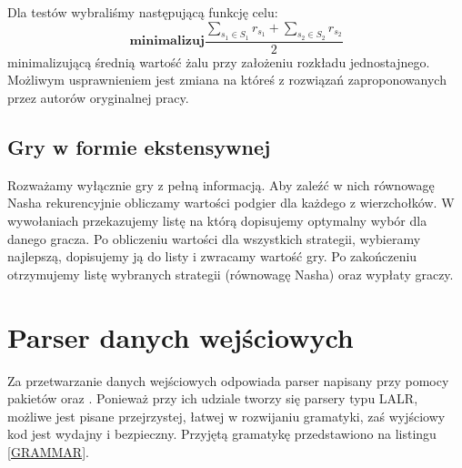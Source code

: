 \documentclass[polish]{standalone}
\begin{document}
Dla testów wybraliśmy następującą funkcję celu:
$$\textbf{minimalizuj} \frac{\sum_{s_1 \in S_1} r_{s_1} + \sum_{s_2 \in S_2} r_{s_2}}{2}$$
minimalizującą średnią wartość żalu przy założeniu rozkładu jednostajnego. Możliwym usprawnieniem jest zmiana na któreś
z rozwiązań zaproponowanych przez autorów oryginalnej pracy.

\subsection{Gry w formie ekstensywnej}

Rozważamy wyłącznie gry z pełną informacją. Aby zaleźć w nich równowagę Nasha rekurencyjnie obliczamy wartości
podgier dla każdego z wierzchołków. W wywołaniach przekazujemy listę na którą dopisujemy optymalny wybór dla danego
gracza. Po obliczeniu wartości dla wszystkich strategii, wybieramy najlepszą, dopisujemy ją do listy i zwracamy wartość
gry. Po zakończeniu otrzymujemy listę wybranych strategii (równowagę Nasha) oraz wypłaty graczy.

\section{Parser danych wejściowych}

Za przetwarzanie danych wejściowych odpowiada parser napisany przy pomocy pakietów  oraz . Ponieważ
przy ich udziale tworzy się parsery typu LALR, możliwe jest pisane przejrzystej, łatwej w rozwijaniu gramatyki, zaś 
wyjściowy kod jest wydajny i bezpieczny. Przyjętą gramatykę przedstawiono na listingu \ref{GRAMMAR}.
\end{document}
